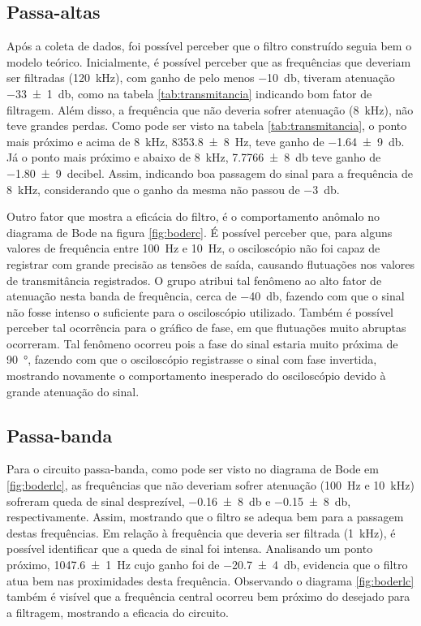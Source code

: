 \subsection{Passa-altas}

  Após a coleta de dados, foi possível perceber que o filtro construído seguia bem o modelo teórico. Inicialmente, é possível perceber que as frequências que deveriam ser filtradas (\SI{120}{\kilo\hertz}), com ganho de pelo menos \SI{-10}{\decibel}, tiveram atenuação \SI{-33(1)}{\decibel}, como na tabela \ref{tab:transmitancia} indicando bom fator de filtragem. Além disso, a frequência que não deveria sofrer atenuação (\SI{8}{\kilo\hertz}), não teve grandes perdas. Como pode ser visto na tabela \ref{tab:transmitancia}, o ponto mais próximo e acima de \SI{8}{\kilo\hertz}, \SI{8353,8(8)}{\hertz}, teve ganho de \SI{-1,64(9)}{\decibel}. Já o ponto mais próximo e abaixo de \SI{8}{\kilo\hertz}, \SI{7,7766(8)}{\decibel} teve ganho de \SI{-1,80(9)}{decibel}. Assim, indicando boa passagem do sinal para a frequência de \SI{8}{\kilo\hertz}, considerando que o ganho da mesma não passou de \SI{-3}{\decibel}.

  Outro fator que mostra a eficácia do filtro, é o comportamento anômalo no diagrama de Bode na figura \ref{fig:boderc}. É possível perceber que, para alguns valores de frequência entre \SI{100}{\hertz} e \SI{10}{\hertz}, o osciloscópio não foi capaz de registrar com grande precisão as tensões de saída, causando flutuações nos valores de transmitância registrados. O grupo atribui tal fenômeno ao alto fator de atenuação nesta banda de frequência, cerca de \SI{-40}{\decibel}, fazendo com que o sinal não fosse intenso o suficiente para o osciloscópio utilizado. Também é possível perceber tal ocorrência para o gráfico de fase, em que flutuações muito abruptas ocorreram. Tal fenômeno ocorreu pois a fase do sinal estaria muito próxima de \SI{90}{\degree}, fazendo com que o osciloscópio registrasse o sinal com fase invertida, mostrando novamente o comportamento inesperado do osciloscópio devido à grande atenuação do sinal.

\subsection{Passa-banda}

  Para o circuito passa-banda, como pode ser visto no diagrama de Bode em \ref{fig:boderlc}, as frequências que não deveriam sofrer  atenuação (\SI{100}{\hertz} e \SI{10}{\kilo\hertz}) sofreram queda de sinal desprezível, \SI[scientific-notation=false]{-0,16(8)}{\decibel} e \SI[scientific-notation=false]{-0,15(8)}{\decibel}, respectivamente. Assim, mostrando que o filtro se adequa bem para a passagem destas frequências. Em relação à frequência que deveria ser filtrada (\SI{1}{\kilo\hertz}), é possível identificar que a queda de sinal foi intensa. Analisando um ponto próximo, \SI{1047,6(1)}{\hertz} cujo ganho foi de \SI{-20,7(4)}{\decibel}, evidencia que o filtro atua bem nas proximidades desta frequência. Observando o diagrama \ref{fig:boderlc} também é visível que a frequência central ocorreu bem próximo do desejado para a filtragem, mostrando a eficacia do circuito.
  

